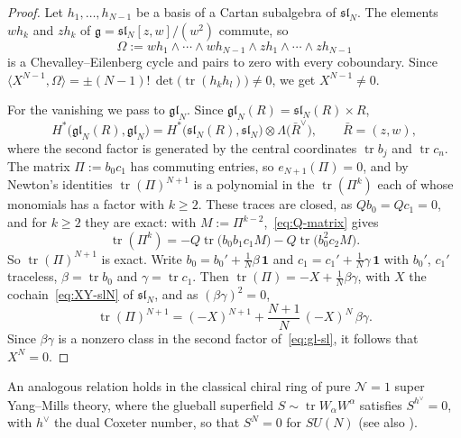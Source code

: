 \documentclass[11pt]{amsart}
\numberwithin{equation}{section}
\theoremstyle{definition}
\theoremstyle{remark}
\newcommand{\g}{\mathfrak{g}}
\begin{document}
\begin{proof}
Let $h_1,\dots,h_{N-1}$ be a basis of a Cartan subalgebra of $\mathfrak{sl}_N$. The elements $wh_k$ and $zh_k$ of $\g=\mathfrak{sl}_N[z,w]/(w^2)$ commute, so
\begin{equation}\label{eq:cartan-cycle}
\Omega:=wh_1\wedge\cdots\wedge wh_{N-1}\wedge zh_1\wedge\cdots\wedge zh_{N-1}
\end{equation}
is a Chevalley--Eilenberg cycle and pairs to zero with every coboundary. Since $\langle X^{N-1},\Omega\rangle=\pm(N-1)!\,\det\bigl(\operatorname{tr}(h_kh_l)\bigr)\ne0$, we get $X^{N-1}\ne0$.

For the vanishing we pass to $\mathfrak{gl}_N$. Since $\mathfrak{gl}_N(R)=\mathfrak{sl}_N(R)\times R$,
\begin{equation}\label{eq:gl-sl}
H^*\bigl(\mathfrak{gl}_N(R),\mathfrak{gl}_N\bigr)=H^*\bigl(\mathfrak{sl}_N(R),\mathfrak{sl}_N\bigr)\otimes\Lambda\bigl(\bar R^\vee\bigr),\qquad \bar R=(z,w),
\end{equation}
where the second factor is generated by the central coordinates $\operatorname{tr}b_j$ and $\operatorname{tr}c_n$. The matrix $\Pi:=b_0c_1$ has commuting entries, so $e_{N+1}(\Pi)=0$, and by Newton's identities $\operatorname{tr}(\Pi)^{N+1}$ is a polynomial in the $\operatorname{tr}(\Pi^k)$ each of whose monomials has a factor with $k\ge2$. These traces are closed, as $Qb_0=Qc_1=0$, and for $k\ge2$ they are exact: with $M:=\Pi^{k-2}$,~\eqref{eq:Q-matrix} gives
\begin{equation}\label{eq:trace-exact}
\operatorname{tr}(\Pi^k)=-Q\operatorname{tr}\bigl(b_0b_1c_1M\bigr)-Q\operatorname{tr}\bigl(b_0^2c_2M\bigr).
\end{equation}
So $\operatorname{tr}(\Pi)^{N+1}$ is exact. Write $b_0=b_0'+\frac1N\beta\,\mathbf 1$ and $c_1=c_1'+\frac1N\gamma\,\mathbf 1$ with $b_0'$, $c_1'$ traceless, $\beta=\operatorname{tr}b_0$ and $\gamma=\operatorname{tr}c_1$. Then $\operatorname{tr}(\Pi)=-X+\frac1N\beta\gamma$, with $X$ the cochain~\eqref{eq:XY-slN} of $\mathfrak{sl}_N$, and as $(\beta\gamma)^2=0$,
\begin{equation}\label{eq:XN-gl}
\operatorname{tr}(\Pi)^{N+1}=(-X)^{N+1}+\frac{N+1}{N}\,(-X)^N\,\beta\gamma .
\end{equation}
Since $\beta\gamma$ is a nonzero class in the second factor of~\eqref{eq:gl-sl}, it follows that $X^N=0$.
\end{proof}

An analogous relation holds in the classical chiral ring of pure $\mathcal N=1$ super Yang--Mills theory, where the glueball superfield $S\sim\operatorname{tr}W_\alpha W^\alpha$ satisfies $S^{h^\vee}=0$, with $h^\vee$ the dual Coxeter number, so that $S^N=0$ for $SU(N)$ \cite{CDSW02} (see also \cite{Wit03,EK03}).
\end{document}

